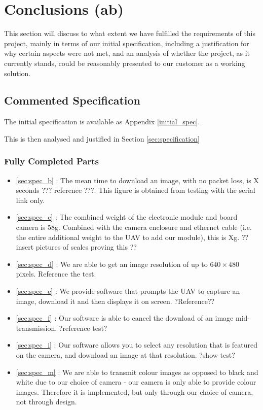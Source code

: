 \chapter{Conclusions (ab)}

This section will discuss to what extent we have fulfilled the requirements 
of this project, mainly in terms of our initial specification, including a 
justification for why certain aspects were not met, and an analysis of 
whether the project, as it currently stands, could be reasonably presented to our customer as a working solution.

\section{Commented Specification}

The initial specification is available as Appendix \ref{initial_spec}. 

This is then analysed and justified in Section \ref{sec:specification}

\subsection{Fully Completed Parts}

\begin{itemize}
\item \ref{sec:spec_b} : The mean time to download an image, with no packet 
loss, is X seconds ??? reference ???. This figure is obtained from testing 
with the serial link only.
\item \ref{sec:spec_c} : The combined weight of the electronic module and 
board camera is 58g. Combined with the camera enclosure and ethernet cable 
(i.e. the entire additional weight to the UAV to add our module), this is Xg.
?? insert pictures of scales proving this ??
\item \ref{sec:spec_d} : We are able to get an image resolution of up to 
$640\times480$ pixels. Reference the test.
\item \ref{sec:spec_e} : We provide software that prompts the UAV to capture 
an image, download it and then displays it on screen. ?Reference??
\item \ref{sec:spec_f} : Our software is able to cancel the download of an 
image mid-transmission. ?reference test?
\item \ref{sec:spec_i} : Our software allows you to select any resolution that 
is featured on the camera, and download an image at that resolution. ?show test?
\item \ref{sec:spec_m} : We are able to transmit colour images as opposed to 
black and white due to our choice of camera - our camera is only able to 
provide colour images. Therefore it is implemented, but only through our 
choice of camera, not through design.
\end{itemize}

